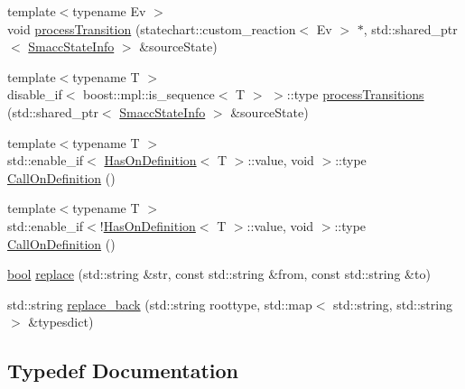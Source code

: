 \begin{DoxyCompactItemize}
\item 
{\footnotesize template$<$typename Ev $>$ }\\void \hyperlink{namespacesmacc_1_1introspection_a25f60bf498ae9f3d0324ed1b84ecbae4}{process\+Transition} (statechart\+::custom\+\_\+reaction$<$ Ev $>$ $\ast$, std\+::shared\+\_\+ptr$<$ \hyperlink{classsmacc_1_1introspection_1_1SmaccStateInfo}{Smacc\+State\+Info} $>$ \&source\+State)
\item 
{\footnotesize template$<$typename T $>$ }\\disable\+\_\+if$<$ boost\+::mpl\+::is\+\_\+sequence$<$ T $>$ $>$\+::type \hyperlink{namespacesmacc_1_1introspection_a24beffddf95fa3dce92051b336e65d8f}{process\+Transitions} (std\+::shared\+\_\+ptr$<$ \hyperlink{classsmacc_1_1introspection_1_1SmaccStateInfo}{Smacc\+State\+Info} $>$ \&source\+State)
\item 
{\footnotesize template$<$typename T $>$ }\\std\+::enable\+\_\+if$<$ \hyperlink{classsmacc_1_1introspection_1_1HasOnDefinition}{Has\+On\+Definition}$<$ T $>$\+::value, void $>$\+::type \hyperlink{namespacesmacc_1_1introspection_a14a28bfad794e98164dce1375d3b0796}{Call\+On\+Definition} ()
\item 
{\footnotesize template$<$typename T $>$ }\\std\+::enable\+\_\+if$<$!\hyperlink{classsmacc_1_1introspection_1_1HasOnDefinition}{Has\+On\+Definition}$<$ T $>$\+::value, void $>$\+::type \hyperlink{namespacesmacc_1_1introspection_a8cfcfc9c8896a6ff4bf22dbce6ecf838}{Call\+On\+Definition} ()
\item 
\hyperlink{classbool}{bool} \hyperlink{namespacesmacc_1_1introspection_a48571b9bf3b115d2a83cc0147c96d0bd}{replace} (std\+::string \&str, const std\+::string \&from, const std\+::string \&to)
\item 
std\+::string \hyperlink{namespacesmacc_1_1introspection_a19350163cda321a04645dcd6f6585f24}{replace\+\_\+back} (std\+::string roottype, std\+::map$<$ std\+::string, std\+::string $>$ \&typesdict)
\end{DoxyCompactItemize}


\subsection{Typedef Documentation}
